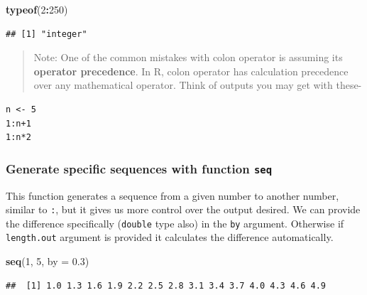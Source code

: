 \documentclass[
]{book}
\newenvironment{Shaded}{\begin{snugshade}}{\end{snugshade}}
\newcommand{\AttributeTok}[1]{\textcolor[rgb]{0.13,0.29,0.53}{#1}}
\newcommand{\DecValTok}[1]{\textcolor[rgb]{0.00,0.00,0.81}{#1}}
\newcommand{\FloatTok}[1]{\textcolor[rgb]{0.00,0.00,0.81}{#1}}
\newcommand{\FunctionTok}[1]{\textcolor[rgb]{0.13,0.29,0.53}{\textbf{#1}}}
\newcommand{\NormalTok}[1]{#1}
\newcommand{\SpecialCharTok}[1]{\textcolor[rgb]{0.81,0.36,0.00}{\textbf{#1}}}
\begin{document}
\begin{Shaded}
\begin{Highlighting}[]
\FunctionTok{typeof}\NormalTok{(}\DecValTok{2}\SpecialCharTok{:}\DecValTok{250}\NormalTok{)}
\end{Highlighting}
\end{Shaded}

\begin{verbatim}
## [1] "integer"
\end{verbatim}

\begin{quote}
Note: One of the common mistakes with colon operator is assuming its \textbf{operator precedence}. In R, colon operator has calculation precedence over any mathematical operator. Think of outputs you may get with these-
\end{quote}

\begin{verbatim}
n <- 5
1:n+1
1:n*2
\end{verbatim}

\hypertarget{generate-specific-sequences-with-function-seq}{%
\subsubsection*{\texorpdfstring{Generate specific sequences with function \texttt{seq}}{Generate specific sequences with function seq}}\label{generate-specific-sequences-with-function-seq}}

This function generates a sequence from a given number to another number, similar to \texttt{:}, but it gives us more control over the output desired. We can provide the difference specifically (\texttt{double} type also) in the \texttt{by} argument. Otherwise if \texttt{length.out} argument is provided it calculates the difference automatically.

\begin{Shaded}
\begin{Highlighting}[]
\FunctionTok{seq}\NormalTok{(}\DecValTok{1}\NormalTok{, }\DecValTok{5}\NormalTok{, }\AttributeTok{by =} \FloatTok{0.3}\NormalTok{)}
\end{Highlighting}
\end{Shaded}

\begin{verbatim}
##  [1] 1.0 1.3 1.6 1.9 2.2 2.5 2.8 3.1 3.4 3.7 4.0 4.3 4.6 4.9
\end{verbatim}
\end{document}
